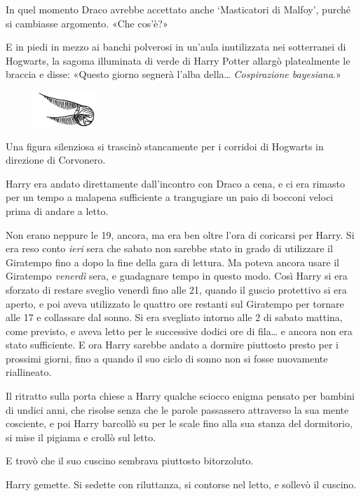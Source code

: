 In quel momento Draco avrebbe accettato anche ‘Masticatori di Malfoy’, purché si cambiasse argomento. «Che cos’è?»

E in piedi in mezzo ai banchi polverosi in un’aula inutilizzata nei sotterranei di Hogwarts, la sagoma illuminata di verde di Harry Potter allargò platealmente le braccia e disse: «Questo giorno segnerà l’alba della… \textit{Cospirazione bayesiana}.»

\begin{figure}[h!]
        \includegraphics[scale=0.4]{boccino.png}
        \centering
\end{figure}

Una figura silenziosa si trascinò stancamente per i corridoi di Hogwarts in direzione di Corvonero.

Harry era andato direttamente dall’incontro con Draco a cena, e ci era rimasto per un tempo a malapena sufficiente a trangugiare un paio di bocconi veloci prima di andare a letto.

Non erano neppure le 19, ancora, ma era ben oltre l’ora di coricarsi per Harry. Si era reso conto \textit{ieri} sera che sabato non sarebbe stato in grado di utilizzare il Giratempo fino a dopo la fine della gara di lettura. Ma poteva ancora usare il Giratempo \textit{venerdì} sera, e guadagnare tempo in questo modo. Così Harry si era sforzato di restare sveglio venerdì fino alle 21, quando il guscio protettivo si era aperto, e poi aveva utilizzato le quattro ore restanti sul Giratempo per tornare alle 17 e collassare dal sonno. Si era svegliato intorno alle 2 di sabato mattina, come previsto, e aveva letto per le successive dodici ore di fila… e ancora non era stato sufficiente. E ora Harry sarebbe andato a dormire piuttosto presto per i prossimi giorni, fino a quando il suo ciclo di sonno non si fosse nuovamente riallineato.

Il ritratto sulla porta chiese a Harry qualche sciocco enigma pensato per bambini di undici anni, che risolse senza che le parole passassero attraverso la sua mente cosciente, e poi Harry barcollò su per le scale fino alla sua stanza del dormitorio, si mise il pigiama e crollò sul letto.

E trovò che il suo cuscino sembrava piuttosto bitorzoluto.

Harry gemette. Si sedette con riluttanza, si contorse nel letto, e sollevò il cuscino.

